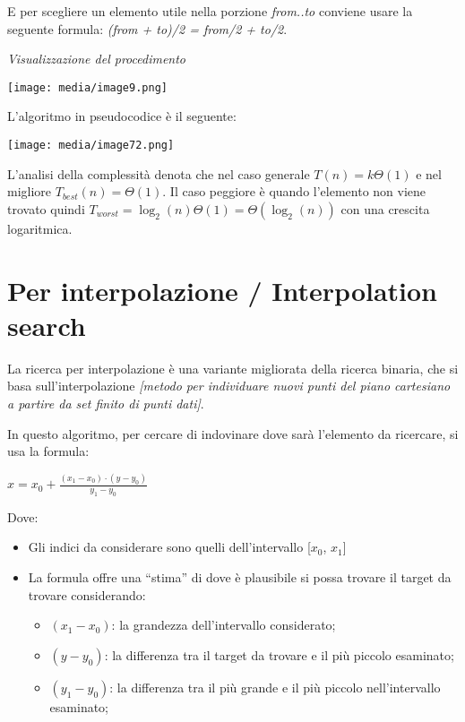 E per scegliere un elemento utile nella porzione \emph{from..to}
conviene usare la seguente formula: \emph{(from + to)/2 = from/2 +
to/2}.

\emph{Visualizzazione del procedimento}

\texttt{[image: media/image9.png]}

L'algoritmo in pseudocodice è il seguente:

\texttt{[image: media/image72.png]}

L'analisi della complessità denota che nel caso generale
\(T(n) = k\Theta(1)\) e nel migliore \(T_{best}(n) = \Theta(1)\). Il
caso peggiore è quando l'elemento non viene trovato quindi
\(T_{worst} = \log_{2}(n)\Theta(1) = \Theta(\log_{2}(n))\) con una
crescita logaritmica.

\section{Per interpolazione / Interpolation
search}\label{per-interpolazione-interpolation-search}

La ricerca per interpolazione è una variante migliorata della ricerca
binaria, che si basa sull'interpolazione \emph{{[}metodo per individuare
nuovi punti del piano cartesiano a partire da set finito di punti
dati{]}}.

In questo algoritmo, per cercare di indovinare dove sarà l'elemento da
ricercare, si usa la formula:

\(x = x_{0} + \frac{(x_{1} - x_{0}) \cdot ({y - y}_{0})}{y_{1} - y_{0}}\)

Dove:

\begin{itemize}
\item
  Gli indici da considerare sono quelli dell'intervallo {[}\(x_{0}\),
  \(x_{1}\){]}
\item
  La formula offre una ``stima'' di dove è plausibile si possa trovare
  il target da trovare considerando:

  \begin{itemize}
  \item
    \((x_{1} - x_{0})\): la grandezza dell'intervallo considerato;
  \item
    \((y - y_{0})\): la differenza tra il target da trovare e il più
    piccolo esaminato;
  \item
    \((y_{1} - y_{0})\): la differenza tra il più grande e il più
    piccolo nell'intervallo esaminato;
  \end{itemize}
\end{itemize}

